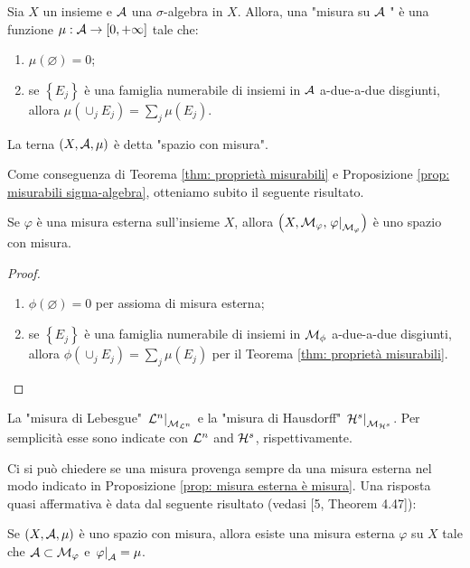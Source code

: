 \begin{definition}[Misura]Sia $X$ un insieme e $\mathcal{A}$ una $\sigma$-algebra in $X$. Allora, una "misura su $\mathcal{A}$ " è una funzione $\mu: \mathcal{A} \rightarrow[0,+\infty]$ tale che:
  \begin{enumerate}[label=$(\roman*)$]
    \item $\mu(\varnothing)=0$;
    \item se $\left\{E_{j}\right\}$ è una famiglia numerabile di insiemi in $\mathcal{A}$ a-due-a-due disgiunti, allora $\mu\left(\cup_{j} E_{j}\right)=\sum_{j} \mu\left(E_{j}\right)$.
  \end{enumerate}
  La terna $(X, \mathcal{A}, \mu)$ è detta "spazio con misura".
\end{definition}
Come conseguenza di Teorema \ref{thm: proprietà misurabili} e Proposizione \ref{prop: misurabili sigma-algebra}, otteniamo subito il seguente risultato.

\begin{proposition}[$\circ$] \label{prop: misura esterna è misura}Se $\varphi$ è una misura esterna sull'insieme $X$, allora $\left(X, \mathcal{M}_{\varphi},\left.\varphi\right|_{\mathcal{M}_{\varphi}}\right)$ è uno spazio con misura.
\end{proposition}
\begin{proof}~
  \begin{enumerate}[label=$(\roman*)$]
    \item $\phi(\varnothing)=0$ per assioma di misura esterna;
    \item se $\left\{E_{j}\right\}$ è una famiglia numerabile di insiemi in $\mathcal{M}_\phi$ a-due-a-due disgiunti, allora $\phi\left(\cup_{j} E_{j}\right)=\sum_{j} \mu\left(E_{j}\right)$ per il Teorema \ref{thm: proprietà misurabili}.
  \end{enumerate}
\end{proof}

\begin{example}La "misura di Lebesgue" $\left.\mathcal{L}^{n}\right|_{\mathcal{M}_{\mathcal{L}^{n}}}$ e la "misura di Hausdorff" $\left.\mathcal{H}^{s}\right|_{\mathcal{M}_{\mathcal{H}^{s}}}$. Per semplicità esse sono indicate con $\mathcal{L}^{n}$ and $\mathcal{H}^{s}$, rispettivamente.
\end{example}

\begin{remark}Ci si può chiedere se una misura provenga sempre da una misura esterna nel modo indicato in Proposizione \ref{prop: misura esterna è misura}. Una risposta quasi affermativa è data dal seguente risultato (vedasi [5, Theorem 4.47]): 
\end{remark}

\begin{shadedTheorem}
  Se $(X, \mathcal{A}, \mu)$ è uno spazio con misura, allora esiste una misura esterna $\varphi$ su $X$ tale che $\mathcal{A} \subset \mathcal{M}_{\varphi}$ e $\left.\varphi\right|_{\mathcal{A}}=\mu$.
\end{shadedTheorem}


